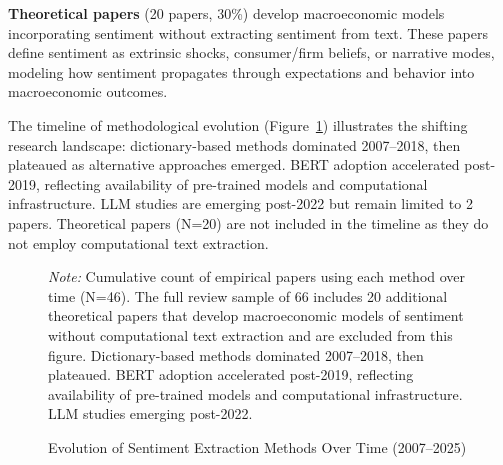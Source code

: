 \documentclass[11pt,twocolumn]{article}
\begin{document}
\textbf{Theoretical papers} (20 papers, 30\%) develop macroeconomic models incorporating sentiment without extracting sentiment from text. These papers define sentiment as extrinsic shocks, consumer/firm beliefs, or narrative modes, modeling how sentiment propagates through expectations and behavior into macroeconomic outcomes.

The timeline of methodological evolution (Figure~\ref{fig:timeline}) illustrates the shifting research landscape: dictionary-based methods dominated 2007--2018, then plateaued as alternative approaches emerged. BERT adoption accelerated post-2019, reflecting availability of pre-trained models and computational infrastructure. LLM studies are emerging post-2022 but remain limited to 2 papers. Theoretical papers (N=20) are not included in the timeline as they do not employ computational text extraction.

\begin{figure}[t]
\centering
\caption{Evolution of Sentiment Extraction Methods Over Time (2007--2025)}
\label{fig:timeline}
\raggedright\footnotesize
\textit{Note:} Cumulative count of empirical papers using each method over time (N=46). The full review sample of 66 includes 20 additional theoretical papers that develop macroeconomic models of sentiment without computational text extraction and are excluded from this figure. Dictionary-based methods dominated 2007--2018, then plateaued. BERT adoption accelerated post-2019, reflecting availability of pre-trained models and computational infrastructure. LLM studies emerging post-2022.
\end{figure}
\end{document}
